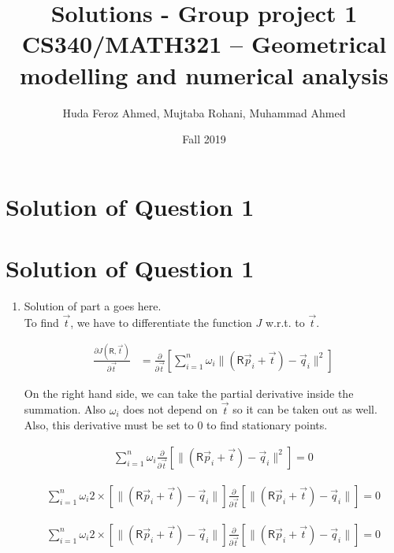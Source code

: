 \documentclass[a4paper, 11pt]{article}
\title{Solutions - Group project 1\\CS340/MATH321 -- Geometrical modelling and numerical analysis}
\date{Fall 2019}
\author{Huda Feroz Ahmed, Mujtaba Rohani, Muhammad Ahmed}
\newcommand{\mat}[1]{\boldsymbol { \mathsf{#1}} }
\newcommand{\norm}[1]{\lVert#1\rVert}
\begin{document}
\maketitle  
\setlength{\parskip}{10pt}
\setlength{\parindent}{0pt}

\section*{Solution of Question 1}
    
\section*{Solution of Question 1}
    
\begin{enumerate}[label=\alph*.]
    \item
    Solution of part a goes here.\\
    
    To find $\Vec{t}$, we have to differentiate the function $J$ w.r.t. to $\Vec{t}$.
    
    \begin{align}
        \frac{\partial J(\mat R,\Vec{t})}{\partial \Vec{t}} & = \frac{\partial}{\partial \Vec{t}} \left[ \sum_{i=1}^{n} \omega_i\norm{(\mat R\vec p_i+\vec t)-\vec q_i}^2 \right]
    \end{align}
    
    On the right hand side, we can take the partial derivative inside the summation. Also $\omega_i$ does not depend on $\vec t$ so it can be taken out as well. Also, this derivative must be set to $0$ to find stationary points.
    
    \begin{align}
         \sum_{i=1}^{n} \omega_i \frac{\partial}{\partial \Vec{t}} \left[ \norm{(\mat R\vec p_i+\vec t)-\vec q_i}^2 \right] = 0
    \end{align} 
    
    \begin{align}
         \sum_{i=1}^{n} \omega_i 2\times \left[ \norm{(\mat R\vec p_i+\vec t)-\vec q_i} \right] \frac{\partial}{\partial \Vec{t}} \left[ \norm{(\mat R\vec p_i+\vec t)-\vec q_i} \right] = 0
    \end{align}
    
    \begin{align}
         \sum_{i=1}^{n} \omega_i 2\times \left[ \norm{(\mat R\vec p_i+\vec t)-\vec q_i} \right] \frac{\partial}{\partial \Vec{t}} \left[ \norm{(\mat R\vec p_i+\vec t)-\vec q_i} \right] = 0
    \end{align}
    

\end{enumerate}
\end{document}
